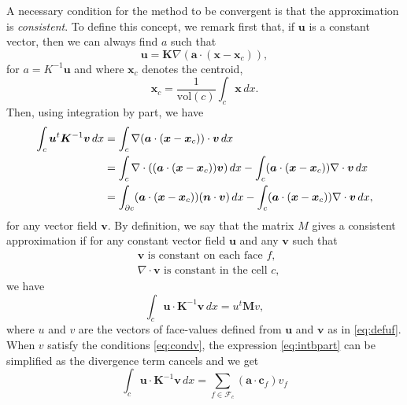 \documentclass[11pt]{amsart}
\newcommand{\vect}[1]{\boldsymbol{#1}}
\newcommand{\mat}[1]{\boldsymbol{#1}}
\newcommand{\grad}{\nabla}
\newcommand{\dive}{\nabla\cdot}
\newcommand{\Fcal}{\mathcal{F}}
\begin{document}
A necessary condition for the method to be convergent is that the approximation is
\emph{consistent}. To define this concept, we remark first that, if $\vect{u}$ is a constant vector,
then we can always find $a$ such that
\begin{equation}
  \label{eq:formu}
  \vect{u} = \mat{K}\grad(\vect{a}\cdot(\vect{x} - \vect{x}_c)),
\end{equation}
for $a=K^{-1}\vect{u}$ and where $\vect{x}_c$ denotes the centroid,
\begin{equation}
  \label{eq:defcentroid}
  \vect{x}_c = \frac{1}{\text{vol}(c)}\int_c \vect{x}\,dx.
\end{equation}
Then, using integration by part, we have
\begin{align}
  \label{eq:intbpart}
  \int_c\vect{u}^t\mat{K}^{-1}\vect{v}\,dx &=  \int_c\grad(\vect{a}\cdot(\vect{x} - \vect{x}_c))\cdot\vect{v}\,dx\\
  \notag                                           &= \int_c\dive((\vect{a}\cdot(\vect{x} - \vect{x}_c))\vect{v})\,dx - \int_c(\vect{a}\cdot(\vect{x} - \vect{x}_c))\dive\vect{v}\,dx\\
  \notag                                           &= \int_{\partial c}(\vect{a}\cdot(\vect{x} - \vect{x}_c))(\vect{n}\cdot\vect{v})\,dx - \int_c(\vect{a}\cdot(\vect{x} - \vect{x}_c))\dive\vect{v}\,dx,
\end{align}
for any vector field $\vect{v}$. By definition, we say that the matrix $M$ gives a consistent
approximation if for any constant vector field $\vect{u}$ and any $\vect{v}$ such that
\begin{subequations}
  \label{eq:condv}
  \begin{align}
&\vect{v} \text{ is constant on each face } f,  \\
&\dive{\vect{v}} \text{ is constant in the cell } c,
  \end{align}
\end{subequations}
we have
\begin{equation}
  \label{eq:consrel}
  \int_c\vect{u}\cdot\mat{K}^{-1}\vect{v}\,dx = u^t\mat{M}v,
\end{equation}
where $u$ and $v$ are the vectors of face-values defined from $\vect{u}$ and $\vect{v}$ as in
\eqref{eq:defuf}. When $v$ satisfy the conditions \eqref{eq:condv}, the expression
\eqref{eq:intbpart} can be simplified as the divergence term cancels and we get
\begin{equation}
 \label{eq:intbpart2}
 \int_c\vect{u}\cdot\mat{K}^{-1}\vect{v}\,dx  = \sum_{f\in\Fcal_c}(\vect{a}\cdot \vect{c}_f)v_f
\end{equation}
\end{document}
